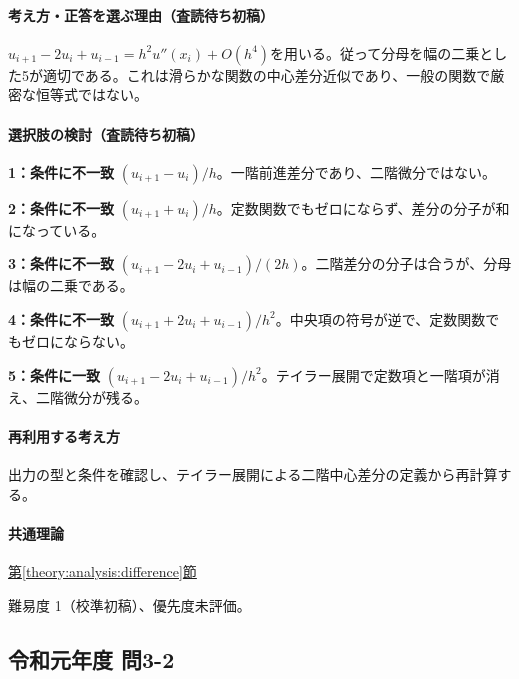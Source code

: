 \paragraph{考え方・正答を選ぶ理由（査読待ち初稿）} \(u_{i+1}-2u_i+u_{i-1}=h^2u''(x_i)+O(h^4)\)を用いる。従って分母を幅の二乗とした5が適切である。これは滑らかな関数の中心差分近似であり、一般の関数で厳密な恒等式ではない。

\paragraph{選択肢の検討（査読待ち初稿）}\mbox{}\par

\noindent\textbf{1：条件に不一致} \((u_{i+1}-u_i)/h\)。一階前進差分であり、二階微分ではない。\par

\noindent\textbf{2：条件に不一致} \((u_{i+1}+u_i)/h\)。定数関数でもゼロにならず、差分の分子が和になっている。\par

\noindent\textbf{3：条件に不一致} \((u_{i+1}-2u_i+u_{i-1})/(2h)\)。二階差分の分子は合うが、分母は幅の二乗である。\par

\noindent\textbf{4：条件に不一致} \((u_{i+1}+2u_i+u_{i-1})/h^2\)。中央項の符号が逆で、定数関数でもゼロにならない。\par

\noindent\textbf{5：条件に一致} \((u_{i+1}-2u_i+u_{i-1})/h^2\)。テイラー展開で定数項と一階項が消え、二階微分が残る。\par

\paragraph{再利用する考え方} 出力の型と条件を確認し、テイラー展開による二階中心差分の定義から再計算する。

\paragraph{共通理論} \hyperref[theory:analysis:difference]{第\ref*{theory:analysis:difference}節}

\par 難易度 1（校準初稿）、優先度未評価。

\subsection{令和元年度 問3-2}
\label{q:r01-reg-basic-3-2}

